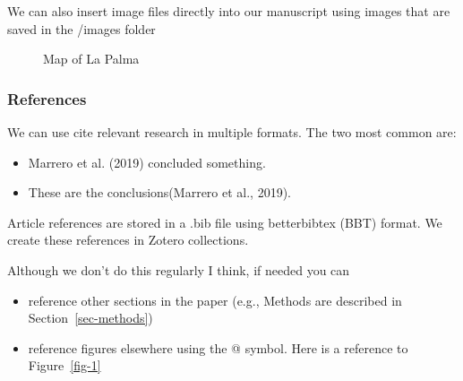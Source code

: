\documentclass[
]{agujournal2019}
\providecommand{\tightlist}{%
  \setlength{\itemsep}{0pt}\setlength{\parskip}{0pt}}\usepackage{longtable,booktabs,array}
\begin{document}
We can also insert image files directly into our manuscript using images
that are saved in the /images folder

\begin{figure}


\caption{\label{fig-map}Map of La Palma}

\end{figure}%

\subsubsection{References}\label{references}

We can use cite relevant research in multiple formats. The two most
common are:

\begin{itemize}
\tightlist
\item
  Marrero et al. (2019) concluded something.\\
\item
  These are the conclusions(Marrero et al., 2019).
\end{itemize}

Article references are stored in a .bib file using betterbibtex (BBT)
format. We create these references in Zotero collections.

Although we don't do this regularly I think, if needed you can

\begin{itemize}
\tightlist
\item
  reference other sections in the paper (e.g., Methods are described in
  Section~\ref{sec-methods})
\item
  reference figures elsewhere using the @ symbol. Here is a reference to
  Figure~\ref{fig-1}
\end{itemize}
\end{document}
